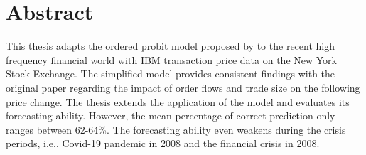 \chapter*{Abstract}


This thesis adapts the ordered probit model proposed by \citet{hausman1992} to the recent high frequency financial world with IBM transaction price data on the New York Stock Exchange. The simplified model provides consistent findings with the original paper regarding the impact of order flows and trade size on the following price change. The thesis extends the application of the model and evaluates its forecasting ability. However, the mean percentage of correct prediction only ranges between 62-64\%. The forecasting ability even weakens during the crisis periods, i.e., Covid-19 pandemic in 2008 and the financial crisis in 2008.